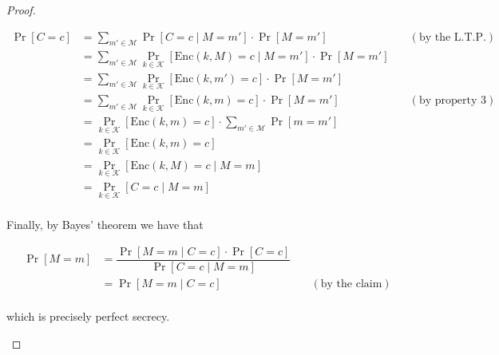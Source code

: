\documentclass[a4paper, 12pt]{report}
\begin{document}
\begin{proof}
\begin{itemize}
{			      \begin{equation*}
				      \begin{alignedat}{2}
					      \Pr[C = c] & = \sum_{m' \in \mathcal M}{\Pr[C = c \mid M = m'] \cdot \Pr[M = m']}                                     & \quad (\mbox{by the L.T.P.}) \\
					                 & = \sum_{m' \in \mathcal M}{\Pr_{k \in \mathcal K}[\mathrm{Enc}(k, M) = c \mid M = m'] \cdot \Pr[M = m']} &                              \\
					                 & = \sum_{m' \in \mathcal M}{\Pr_{k \in \mathcal K}[\mathrm{Enc}(k, m') = c] \cdot \Pr[M = m']}            &                              \\
					                 & = \sum_{m' \in \mathcal M}{\Pr_{k \in \mathcal K}[\mathrm{Enc}(k, m) = c] \cdot \Pr[M = m']}             & \quad (\mbox{by property 3}) \\
					                 & = \Pr_{k \in \mathcal K}[\mathrm{Enc}(k, m) = c] \cdot \sum_{m' \in \mathcal M}{\Pr[m = m']}             &                              \\
					                 & = \Pr_{k \in \mathcal K}[\mathrm{Enc}(k, m) = c]                                                         &                              \\
					                 & = \Pr_{k \in \mathcal K}[\mathrm{Enc}(k, M) = c \mid M = m]                                              &                              \\
					                 & = \Pr_{k \in \mathcal K}[C = c \mid M = m]                                                               &                              \\
				      \end{alignedat}
			      \end{equation*}
		      }

		      Finally, by Bayes' theorem we have that

		      \begin{equation*}
			      \begin{alignedat}{2}
				      \Pr[M = m] & = \dfrac{\Pr[M = m \mid C = c] \cdot \Pr[C = c]}{\Pr[C = c \mid M = m]} &                             \\
				                 & = \Pr[M = m \mid C = c]                                                 & \quad (\mbox{by the claim}) \\
			      \end{alignedat}
		      \end{equation*}

		      which is precisely perfect secrecy.
	\end{itemize}
\end{proof}
\end{document}
